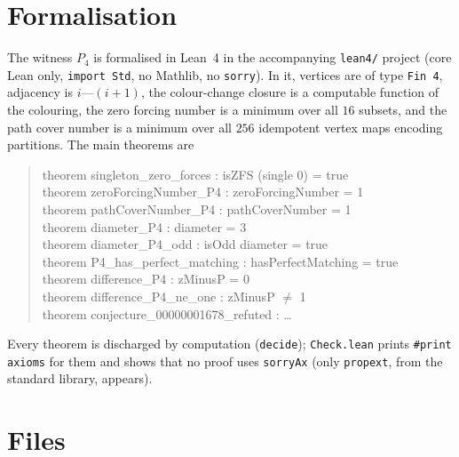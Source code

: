 \documentclass[11pt]{article}
\theoremstyle{definition}
\theoremstyle{remark}
\begin{document}
\section{Formalisation}

The witness $P_4$ is formalised in Lean~4 in the accompanying \texttt{lean4/}
project (core Lean only, \texttt{import Std}, no Mathlib, no \texttt{sorry}). In
it, vertices are of type \texttt{Fin 4}, adjacency is $i\text{---}(i+1)$, the
colour-change closure is a computable function of the colouring, the zero
forcing number is a minimum over all $16$ subsets, and the path cover number is
a minimum over all $256$ idempotent vertex maps encoding partitions. The main
theorems are

\begin{quote}\ttfamily
theorem singleton\_zero\_forces : isZFS (single 0) = true\\
theorem zeroForcingNumber\_P4 : zeroForcingNumber = 1\\
theorem pathCoverNumber\_P4 : pathCoverNumber = 1\\
theorem diameter\_P4 : diameter = 3\\
theorem diameter\_P4\_odd : isOdd diameter = true\\
theorem P4\_has\_perfect\_matching : hasPerfectMatching = true\\
theorem difference\_P4 : zMinusP = 0\\
theorem difference\_P4\_ne\_one : zMinusP \(\ne\) 1\\
theorem conjecture\_00000001678\_refuted : \dots
\end{quote}

\noindent
Every theorem is discharged by computation (\texttt{decide}); \texttt{Check.lean}
prints \texttt{\#print axioms} for them and shows that no proof uses
\texttt{sorryAx} (only \texttt{propext}, from the standard library, appears).

\section{Files}
\end{document}
